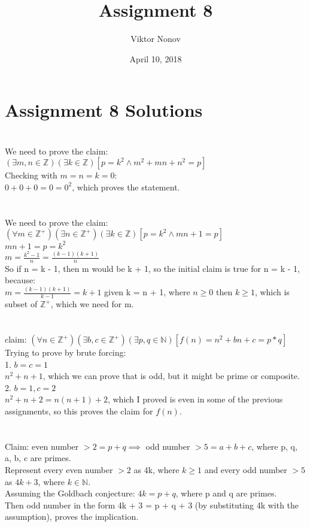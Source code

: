 \documentclass{article}
\title{Assignment 8}
\author{Viktor Nonov}
\date{April 10, 2018}
\begin{document}
\section*{Assignment 8 Solutions}

\section{}
We need to prove the claim: $(\exists m,n \in \mathbb{Z})(\exists k \in \mathbb{Z})[p = k^2 \wedge m^2 + mn + n^2  = p]$\\
Checking with $m = n = k = 0$:\\
$0 + 0 + 0 = 0 = 0^2$, which proves the statement.

\section{}
We need to prove the claim:\\
$(\forall m \in \mathbb{Z^+})(\exists n \in \mathbb{Z^+})(\exists k \in \mathbb{Z})[p = k^2 \wedge mn + 1 = p]$\\
$mn + 1 = p = k^2$\\
$m = \frac{k^2 - 1}{n} = \frac{(k - 1)(k + 1)}{n}$\\
So if n = k - 1, then m would be k + 1, so the initial claim is true for n = k - 1, because:\\
$m = \frac{(k - 1)(k + 1)}{k - 1} = k + 1$ given k = n + 1, where $n \geq 0$ then $k \geq 1$, which is subset of $\mathbb{Z^+}$, which we need for m.\\

\section{}
claim: $(\forall n \in \mathbb{Z^+})(\exists b,c \in \mathbb{Z^+})(\exists p,q \in \mathbb{N})[f(n) = n^2 + bn + c = p*q]$\\
Trying to prove by brute forcing:\\
1. $b = c = 1$\\
$n^2 + n + 1$, which we can prove that is odd, but it might be prime or composite.\\
2. $b = 1, c = 2$\\
$n^2 + n + 2 = n(n+1) + 2$, which I proved is even in some of the previous assignments, so this proves the claim for $f(n)$.

\section{}
Claim: even number $> 2 = p + q \implies$ odd number $ > 5 = a + b + c$, where p, q, a, b, c are primes.\\
Represent every even number $> 2$ as 4k, where $k \geq 1$ and every odd number $> 5$ as $4k + 3$, where $k \in \mathbb{N}$.\\
Assuming the Goldbach conjecture: $4k = p + q$, where p and q are primes.\\
Then odd number in the form 4k + 3 = p + q + 3 (by substituting 4k with the assumption), proves the implication.\\
\end{document}
